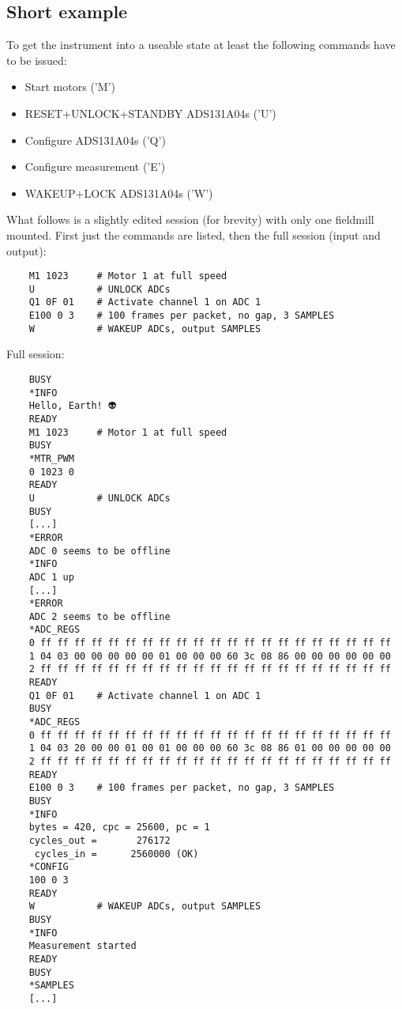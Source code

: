 \documentclass{article}
\begin{document}
\subsection{Short example}

To get the instrument into a useable state at least the following commands have to be issued:

\begin{itemize}
\item Start motors ('M')
\item RESET+UNLOCK+STANDBY ADS131A04s ('U')
\item Configure ADS131A04s ('Q')
\item Configure measurement ('E')
\item WAKEUP+LOCK ADS131A04s ('W')
\end{itemize}

What follows is a slightly edited session (for brevity) with only one fieldmill mounted.
First just the commands are listed, then the full session (input and output):

\begin{lstlisting}
    M1 1023     # Motor 1 at full speed
    U           # UNLOCK ADCs
    Q1 0F 01    # Activate channel 1 on ADC 1
    E100 0 3    # 100 frames per packet, no gap, 3 SAMPLES
    W           # WAKEUP ADCs, output SAMPLES
\end{lstlisting}

Full session:

\begin{lstlisting}
    BUSY
    *INFO
    Hello, Earth! 👽
    READY
    M1 1023     # Motor 1 at full speed
    BUSY
    *MTR_PWM
    0 1023 0
    READY
    U           # UNLOCK ADCs
    BUSY
    [...]
    *ERROR
    ADC 0 seems to be offline
    *INFO
    ADC 1 up
    [...]
    *ERROR
    ADC 2 seems to be offline
    *ADC_REGS
    0 ff ff ff ff ff ff ff ff ff ff ff ff ff ff ff ff ff ff ff ff ff
    1 04 03 00 00 00 00 00 01 00 00 00 60 3c 08 86 00 00 00 00 00 00
    2 ff ff ff ff ff ff ff ff ff ff ff ff ff ff ff ff ff ff ff ff ff
    READY
    Q1 0F 01    # Activate channel 1 on ADC 1
    BUSY
    *ADC_REGS
    0 ff ff ff ff ff ff ff ff ff ff ff ff ff ff ff ff ff ff ff ff ff
    1 04 03 20 00 00 01 00 01 00 00 00 60 3c 08 86 01 00 00 00 00 00
    2 ff ff ff ff ff ff ff ff ff ff ff ff ff ff ff ff ff ff ff ff ff
    READY
    E100 0 3    # 100 frames per packet, no gap, 3 SAMPLES
    BUSY
    *INFO
    bytes = 420, cpc = 25600, pc = 1
    cycles_out =       276172
     cycles_in =      2560000 (OK)
    *CONFIG
    100 0 3
    READY
    W           # WAKEUP ADCs, output SAMPLES
    BUSY
    *INFO
    Measurement started
    READY
    BUSY
    *SAMPLES
    [...]
\end{lstlisting}
\end{document}
